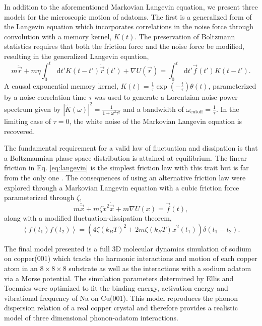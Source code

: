 \documentclass[7pt]{article}
\newcommand*{\diff}{\mathop{}\!\mathrm{d}}
\begin{document}
In addition to the aforementioned Markovian Langevin equation, we present three models for the microscopic motion of adatoms. The first is a generalized form of the Langevin equation which incorporates correlations in the noise force through convolution with a memory kernel, $K(t)$. The preservation of Boltzmann statistics requires that both the friction force and the noise force be modified, resulting in the generalized Langevin equation\cite{Kubo},
\begin{equation}
	m\ddot{\vec{r}}+m\eta\int_0^t\diff{t'}K(t-t')\dot{\vec{r}}(t')+\nabla U(\vec{r})=\int_0^t\diff{t'}\vec{f}(t')K(t-t').
	\label{eq:gle}
\end{equation}
A causal exponential memory kernel, $K(t)=\frac{1}{\tau}\exp\left(-\frac{t}{\tau}\right)\theta(t)$, parameterized by a noise correlation time $\tau$ was used to generate a Lorentzian noise power spectrum given by $\left|\tilde{K}(\omega)\right|^2=\frac{1}{1+\omega^2\tau^2}$ and a bandwidth of $\omega_\text{cutoff}=\frac{1}{\tau}$. In the limiting case of $\tau=0$, the white noise of the Markovian Langevin equation is recovered. 

The fundamental requirement for a valid law of fluctuation and dissipation is that a Boltzmannian phase space distribution is attained at equilibrium. The linear friction in Eq. \ref{eq:langevin} is the simplest friction law with this trait but is far from the only one \cite{Kramers}. The consequences of using an alternative friction law were explored through a Markovian Langevin equation with a cubic friction force parameterized through $\zeta$,
$$
m\ddot{\vec{x}} + m\zeta\dot{x}^2\dot{\vec{x}} + m \nabla U(x) = \vec{f}(t),
$$
along with a modified fluctuation-dissipation theorem\cite{Kramers},
$$\left<f(t_1)f(t_2)\right>=\left(4\zeta\left(k_BT\right)^2 + 2 m \zeta \left(k_BT\right)\dot{x}^2(t_1)\right)\delta\left(t_1-t_2\right).$$

The final model presented is a full 3D molecular dynamics simulation of sodium on copper(001) which tracks the harmonic interactions and motion of each copper atom in an $8\times8\times8$ substrate as well as the interactions with a sodium adatom via a Morse potential. The simulation parameters determined by Ellis and Toennies\cite{Ellis} were optimized to fit the binding energy, activation energy and vibrational frequency of Na on Cu(001). This model reproduces the phonon dispersion relation of a real copper crystal\cite{Sinha} and therefore provides a realistic model of three dimensional phonon-adatom interactions.
\end{document}
